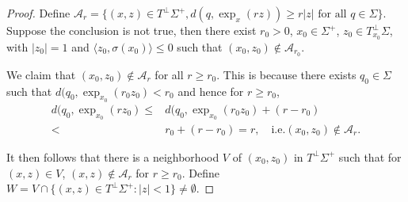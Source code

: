 \documentclass[11pt, reqno]{amsart}
\numberwithin{equation}{section}
\begin{document}
\begin{proof}
Define $\mathcal A_r=\{(x, z)\in T^\perp\Sigma^+, d\left(q, \exp_x(r z)\right) \ge r|z| \text { for all } q \in \Sigma \}$.
Suppose the conclusion is not true, then there exist $r_{0}>0$, $x_{0} \in \Sigma^+$, $z_{0}\in T_{x_0}^\perp \Sigma$, with $|z_{0}|=1$ and $\langle z_0, \sigma(x_0)\rangle \le 0$ such that $(x_{0}, z_{0})\notin \mathcal A_{r_{0}}$.

We claim that
$(x_0, z_0)\notin \mathcal A_{r}$ for all $r\ge r_0$. This is because there exists $q_0\in \Sigma$ such that
$d(q_0, \exp_{x_0}(r_0z_0) <r_0$ and hence for $r\ge r_0$,
\begin{align*}
d(q_0, \exp_{x_0}(rz_0)
\le& d(q_0, \exp_{x_0}(r_0z_0) +(r-r_0) \\
<& r_0 +(r-r_0)
=r, \quad \text{i.e.}(x_0, z_0)\notin \mathcal A_r.
\end{align*}

It then follows that there is a neighborhood $V$ of $(x_0, z_0)$ in $T^\perp \Sigma^+$ such that for $(x, z)\in V$, $(x, z)\notin \mathcal A_r$ for $r\ge r_0$. Define $W=V\cap \{(x, z)\in T^\perp \Sigma^+: |z|<1\}\ne \emptyset$.


\end{proof}
\end{document}
